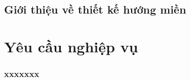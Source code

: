 \documentclass{article} %
\begin{document}
% 


\subsection{Giới thiệu về thiết kế hướng miền}

% 


\section{Yêu cầu nghiệp vụ}

% 

\subsubsection{xxxxxxx} 
% 
\end{document}

